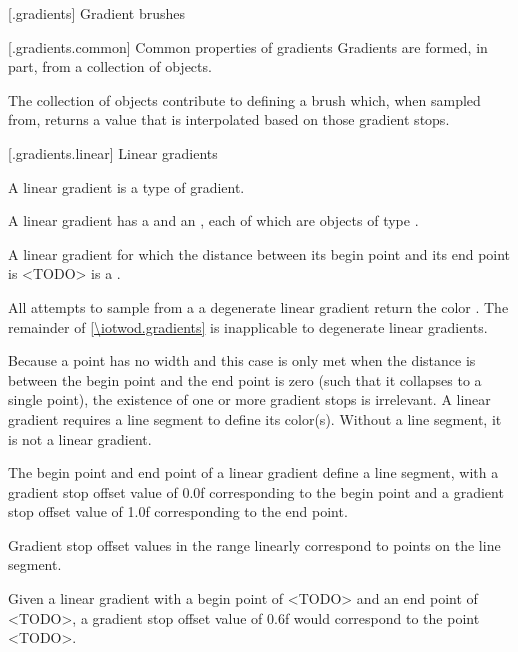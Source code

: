  [\iotwod.gradients] {Gradient brushes}

 [\iotwod.gradients.common] {Common properties of gradients}
\pnum
Gradients are formed, in part, from a collection of  objects.

\pnum
The collection of  objects contribute to defining a brush which, when sampled from, returns a value that is interpolated based on those gradient stops.

 [\iotwod.gradients.linear] {Linear gradients}

\pnum
A linear gradient is a type of gradient.

\pnum
A linear gradient has a  and an , each of which are objects of type .

\pnum
A linear gradient for which the distance between its begin point and its end point is <TODO> is a .

\pnum
All attempts to sample from a a degenerate linear gradient return the color . The remainder of \ref{\iotwod.gradients} is inapplicable to degenerate linear gradients.
\begin{note}
Because a point has no width and this case is only met when the distance is between the begin point and the end point is zero (such that it collapses to a single point), the existence of one or more gradient stops is irrelevant. A linear gradient requires a line segment to define its color(s). Without a line segment, it is not a linear gradient.
\end{note}

\pnum
The begin point and end point of a linear gradient define a line segment, with a gradient stop offset value of 0.0f corresponding to the begin point and a gradient stop offset value of 1.0f corresponding to the end point.

\pnum
Gradient stop offset values in the range  linearly correspond to points on the line segment.

\pnum
\begin{example}
Given a linear gradient with a begin point of <TODO> and an end point of <TODO>, a gradient stop offset value of 0.6f would correspond to the point <TODO>.
\end{example}

